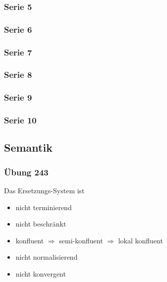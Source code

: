 \documentclass[
  a4paper,
  11pt,
]{scrartcl}
\begin{document}



\subsubsection{Serie 5}
\label{sub:serie_5}




\subsubsection{Serie 6}
\label{sub:serie_6}




\subsubsection{Serie 7}
\label{sub:serie_7}




\subsubsection{Serie 8}
\label{sub:serie_8}




\subsubsection{Serie 9}
\label{sub:serie_9}




\subsubsection{Serie 10}
\label{sub:serie_10}



\subsection{Semantik}
\label{sec:semantik}

\subsubsection{Übung 243}
\label{ssub:Uebung 243}

Das Ersetzungs-System ist
\begin{itemize}
  \item nicht terminierend
  \item nicht beschränkt
  \item konfluent $\Rightarrow$ semi-konfluent $\Rightarrow$ lokal konfluent
  \item nicht normalisierend
  \item nicht konvergent
\end{itemize}
\end{document}
